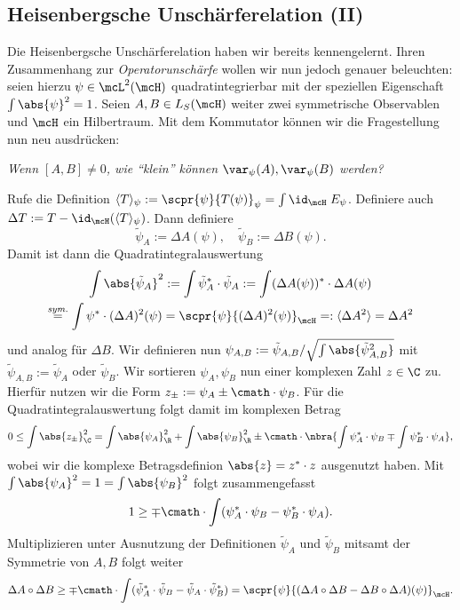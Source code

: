 \documentclass{subfiles}
\begin{document}
    \subsection{Heisenbergsche Unschärferelation (II)}
        Die Heisenbergsche Unschärferelation haben wir bereits kennengelernt. Ihren Zusammenhang zur \emph{Operatorunschärfe} wollen wir nun jedoch genauer beleuchten: seien hierzu $\psi\in\mcL^2(\mcH)$ quadratintegrierbar mit der speziellen Eigenschaft $\int\abs{\psi}^2 = 1$. Seien $A,B\in L_S(\mcH)$ weiter zwei symmetrische Observablen und $\mcH$ ein Hilbertraum. Mit dem Kommutator können wir die Fragestellung nun neu ausdrücken:
        \begin{center}
            \textit{Wenn $[A,B]\neq 0$, wie \enquote{klein} können $\var_\psi(A),\var_\psi(B)$ werden?}
        \end{center}
        Rufe die Definition $\langle T\rangle_\psi := \scpr{\psi}{T(\psi)}_\psi = \int\id_\mcH\;E_\psi$. Definiere auch $\Delta T:= T-\id_{\mcH}(\langle T\rangle_\psi)$. Dann definiere 
        \[\tilde\psi_A:=\Delta A(\psi),\quad \tilde\psi_B:=\Delta B(\psi).\]
        Damit ist dann die Quadratintegralauswertung
        \begin{multline*}
            \int\abs{\tilde\psi_A}^2 := \int\tilde\psi_A^*\cdot\tilde\psi_A := \int (\Delta A(\psi))^*\cdot \Delta A(\psi) \\
            \stackrel{\textit{sym.}}{=} \int \psi^*\cdot (\Delta A)^2(\psi) = \scpr{\psi}{(\Delta A)^2(\psi)}_\mcH =: \langle\Delta A^2\rangle = \Delta A^2
        \end{multline*}
        und analog für $\Delta B$. Wir definieren nun $\psi_{A,B}:=\tilde\psi_{A,B}/\sqrt{\int\abs{\tilde\psi_{A,B}^2}}$ mit $\tilde\psi_{A,B}:= \tilde\psi_A$ oder $\tilde\psi_B$. Wir sortieren $\psi_A,\psi_B$ nun einer komplexen Zahl $z\in\C$ zu. Hierfür nutzen wir die Form $z_\pm:=\psi_A\pm\cmath\cdot\psi_B$. Für die Quadratintegralauswertung folgt damit im komplexen Betrag
        \[0\leq\int\abs{z_\pm}_\C^2 = \int\abs{\psi_A}_\R^2+\int\abs{\psi_B}_\R^2\pm\cmath\cdot\nbra{\int\psi_A^*\cdot\psi_B\mp\int\psi_B^*\cdot\psi_A},\]
        wobei wir die komplexe Betragsdefinion $\abs{z} = z^*\cdot z$ ausgenutzt haben. Mit $\int\abs{\psi_A}^2 = 1 = \int\abs{\psi_B}^2$ folgt zusammengefasst
        \[1\geq \mp\cmath\cdot\int (\psi_A^*\cdot\psi_B - \psi_B^*\cdot\psi_A).\]
        Multiplizieren unter Ausnutzung der Definitionen $\tilde\psi_A$ und $\tilde\psi_B$ mitsamt der Symmetrie von $A,B$ folgt weiter
        \[\Delta A\circ\Delta B\geq\mp\cmath\cdot\int(\tilde\psi_A^*\cdot\tilde\psi_B-\tilde\psi_A\cdot\tilde\psi_B^*) = \scpr{\psi}{(\Delta A\circ\Delta B-\Delta B\circ\Delta A)(\psi)}_\mcH.\]
\end{document}
